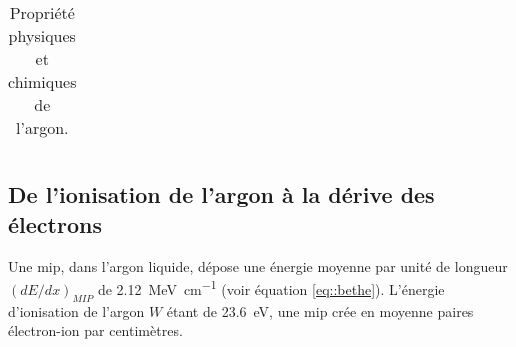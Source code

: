 \begin{table}[htpb]
\begin{tabular}{|l|c|}
        \hline
      \end{tabular}
      \caption{\label{tab::Ar}Propriété physiques et chimiques de l'argon.}
    \end{table}

    \subsection{De l'ionisation de l'argon à la dérive des électrons}
        Une \gls{mip}, dans l'argon liquide, dépose une énergie moyenne par unité de longueur $(dE/dx)_{MIP}$ de \SI{2.12}{\mega\electronvolt\per\centi\meter} (voir équation \eqref{eq::bethe}). L'énergie d'ionisation de l'argon $W$ étant de \SI{23.6}{\eV}, une \gls{mip} crée en moyenne  paires électron-ion par centimètres.
